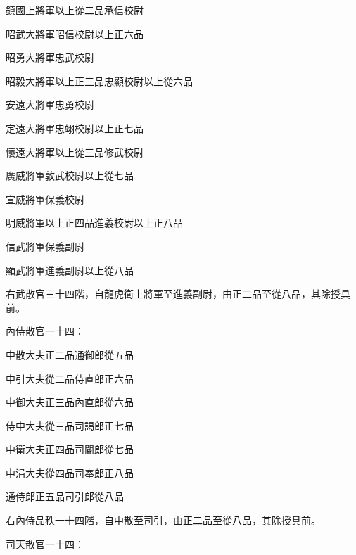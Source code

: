 \begin{pinyinscope}
 鎮國上將軍以上從二品承信校尉



 昭武大將軍昭信校尉以上正六品



 昭勇大將軍忠武校尉



 昭毅大將軍以上正三品忠顯校尉以上從六品



 安遠大將軍忠勇校尉



 定遠大將軍忠翊校尉以上正七品



 懷遠大將軍以上從三品修武校尉



 廣威將軍敦武校尉以上從七品



 宣威將軍保義校尉



 明威將軍以上正四品進義校尉以上正八品



 信武將軍保義副尉



 顯武將軍進義副尉以上從八品



 右武散官三十四階，自龍虎衛上將軍至進義副尉，由正二品至從八品，其除授具前。



 內侍散官一十四：



 中散大夫正二品通御郎從五品



 中引大夫從二品侍直郎正六品



 中御大夫正三品內直郎從六品



 侍中大夫從三品司謁郎正七品



 中衛大夫正四品司閽郎從七品



 中涓大夫從四品司奉郎正八品



 通侍郎正五品司引郎從八品



 右內侍品秩一十四階，自中散至司引，由正二品至從八品，其除授具前。



 司天散官一十四：




\end{pinyinscope}
